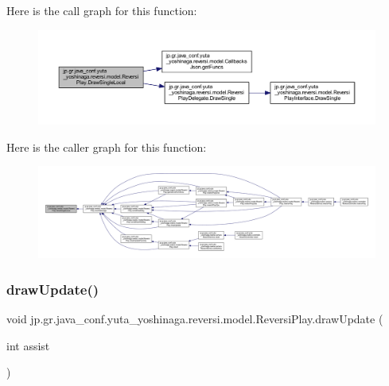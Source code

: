 Here is the call graph for this function\+:
\nopagebreak
\begin{figure}[H]
\begin{center}
\leavevmode
\includegraphics[width=350pt]{classjp_1_1gr_1_1java__conf_1_1yuta__yoshinaga_1_1reversi_1_1model_1_1_reversi_play_a0218c589d8567d52f92ab87bc4bec30f_cgraph}
\end{center}
\end{figure}
Here is the caller graph for this function\+:
\nopagebreak
\begin{figure}[H]
\begin{center}
\leavevmode
\includegraphics[width=350pt]{classjp_1_1gr_1_1java__conf_1_1yuta__yoshinaga_1_1reversi_1_1model_1_1_reversi_play_a0218c589d8567d52f92ab87bc4bec30f_icgraph}
\end{center}
\end{figure}
\mbox{\label{classjp_1_1gr_1_1java__conf_1_1yuta__yoshinaga_1_1reversi_1_1model_1_1_reversi_play_a0522dfef43ea5a95aaa2086c22fcefe0}} 
\subsubsection{\texorpdfstring{draw\+Update()}{drawUpdate()}}
{\footnotesize\ttfamily void jp.\+gr.\+java\+\_\+conf.\+yuta\+\_\+yoshinaga.\+reversi.\+model.\+Reversi\+Play.\+draw\+Update (\begin{DoxyParamCaption}\item[{int}]{assist }\end{DoxyParamCaption})}




